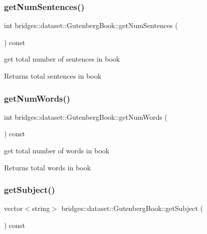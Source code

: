 \subsubsection{\texorpdfstring{get\+Num\+Sentences()}{getNumSentences()}}
{\footnotesize\ttfamily int bridges\+::dataset\+::\+Gutenberg\+Book\+::get\+Num\+Sentences (\begin{DoxyParamCaption}{ }\end{DoxyParamCaption}) const\hspace{0.3cm}{\ttfamily [inline]}}

get total number of sentences in book \begin{DoxyReturn}{Returns}
total sentences in book 
\end{DoxyReturn}
\mbox{\label{classbridges_1_1dataset_1_1_gutenberg_book_a5a2042c0a79338f12192a47d093d16fd}} 
\subsubsection{\texorpdfstring{get\+Num\+Words()}{getNumWords()}}
{\footnotesize\ttfamily int bridges\+::dataset\+::\+Gutenberg\+Book\+::get\+Num\+Words (\begin{DoxyParamCaption}{ }\end{DoxyParamCaption}) const\hspace{0.3cm}{\ttfamily [inline]}}

get total number of words in book \begin{DoxyReturn}{Returns}
total words in book 
\end{DoxyReturn}
\mbox{\label{classbridges_1_1dataset_1_1_gutenberg_book_ad84630cbd83ed0eca40e5008d43cf7d6}} 
\subsubsection{\texorpdfstring{get\+Subject()}{getSubject()}}
{\footnotesize\ttfamily vector$<$string$>$ bridges\+::dataset\+::\+Gutenberg\+Book\+::get\+Subject (\begin{DoxyParamCaption}{ }\end{DoxyParamCaption}) const\hspace{0.3cm}{\ttfamily [inline]}}

